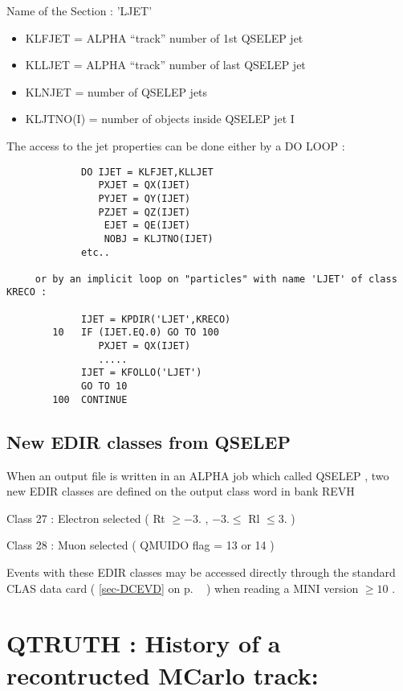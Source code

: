          Name of the Section : 'LJET'
\begin{itemize}
\item        KLFJET     = ALPHA ``track'' number of 1st  QSELEP jet
\item        KLLJET     = ALPHA ``track'' number of last QSELEP jet
\item        KLNJET     = number of QSELEP jets
\item        KLJTNO(I)  = number of objects inside QSELEP jet I
\end{itemize}
         The access to the jet properties can be done either by a DO LOOP :
\begin{verbatim}
             DO IJET = KLFJET,KLLJET
                PXJET = QX(IJET)
                PYJET = QY(IJET)
                PZJET = QZ(IJET)
                 EJET = QE(IJET)
                 NOBJ = KLJTNO(IJET)
             etc..
 
     or by an implicit loop on "particles" with name 'LJET' of class KRECO :
 
             IJET = KPDIR('LJET',KRECO)
        10   IF (IJET.EQ.0) GO TO 100
                PXJET = QX(IJET)
                .....
             IJET = KFOLLO('LJET')
             GO TO 10
        100  CONTINUE
\end{verbatim}
 
 
\subsection{\label{sec-QSELED}New EDIR classes from QSELEP }
\par
 
         When an output file is written in an ALPHA job which called QSELEP ,
         two new EDIR classes are defined on the output class word in bank REVH
 
              Class 27 :  Electron selected ( Rt $\geq -3.$ , $ -3. \leq$  Rl $ \leq 3.$ )
 
              Class 28 :  Muon selected ( QMUIDO flag = 13 or 14 )
 
     Events with these EDIR classes may be accessed directly through the standard  CLAS data card ( \ref{sec-DCEVD} on p.
     ~\pageref{sec-DCEVD} )  when reading a MINI version $\geq 10$ .
 
\par
\section{\label{sec-OAQTRUT}QTRUTH : History of a recontructed MCarlo track:}
\par
{}
\par
 
